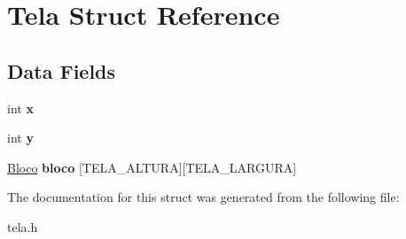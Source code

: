\hypertarget{structTela}{\section{Tela Struct Reference}
\label{structTela}
}
\subsection*{Data Fields}
\begin{DoxyCompactItemize}
\item 
\hypertarget{structTela_a3e696083bd36081cb322b8b4aeffaece}{int {\bfseries x}}\label{structTela_a3e696083bd36081cb322b8b4aeffaece}

\item 
\hypertarget{structTela_a97526743bcb6afe2141004444f40383e}{int {\bfseries y}}\label{structTela_a97526743bcb6afe2141004444f40383e}

\item 
\hypertarget{structTela_a07d5cc8c7153ba87ba3dee3ee99a1763}{\hyperlink{structBloco}{Bloco} {\bfseries bloco} \mbox{[}T\-E\-L\-A\-\_\-\-A\-L\-T\-U\-R\-A\mbox{]}\mbox{[}T\-E\-L\-A\-\_\-\-L\-A\-R\-G\-U\-R\-A\mbox{]}}\label{structTela_a07d5cc8c7153ba87ba3dee3ee99a1763}

\end{DoxyCompactItemize}


The documentation for this struct was generated from the following file\-:\begin{DoxyCompactItemize}
\item 
tela.\-h\end{DoxyCompactItemize}
